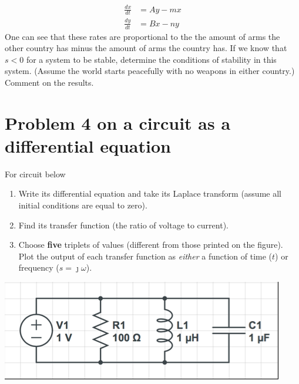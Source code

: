 \documentclass[11pt]{book}
\begin{document}
\begin{align}
	\frac{dx}{dt} &= Ay - mx \\
	\frac{dy}{dt} &= Bx - ny
\end{align}
One can see that these rates are proportional to the the amount of arms the other country has minus the amount of arms the country has. If we know that $s < 0$ for a system to be stable, determine the conditions of stability in this system. (Assume the world starts peacefully with no weapons in either country.) Comment on the results. 

\newpage

\section{Problem 4 on a circuit as a differential equation}
For circuit below
\begin{enumerate}
	\item Write its differential equation and take its Laplace transform (assume all initial conditions are equal to zero). 
	\item Find its transfer function (the ratio of voltage to current).
	\item  Choose \textbf{five} triplets of values (different from those printed on the figure). Plot the output of each transfer function as \textit{either} a function of time ($t$) or frequency ($s = \jmath \omega $).
\end{enumerate} 


\begin{center}
	\includegraphics{figures/hw3.01.png}
\end{center}

\newpage
\end{document}

